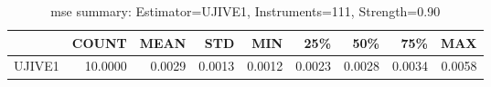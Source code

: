 \begin{table}[ht]
\centering
\caption{mse summary: Estimator=UJIVE1, Instruments=111, Strength=0.90}
\begin{tabular}{lrrrrrrrr}
\toprule
 & COUNT & MEAN & STD & MIN & 25\% & 50\% & 75\% & MAX \\
\midrule
UJIVE1 & 10.0000 & 0.0029 & 0.0013 & 0.0012 & 0.0023 & 0.0028 & 0.0034 & 0.0058 \\
\bottomrule
\end{tabular}
\end{table}
